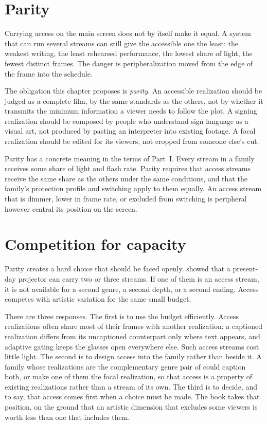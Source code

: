 \section{Parity}

Carrying access on the main screen does not by itself make it equal. A system that can run several streams can still give the accessible one the least: the weakest writing, the least rehearsed performance, the lowest share of light, the fewest distinct frames. The danger is peripheralization moved from the edge of the frame into the schedule.

The obligation this chapter proposes is \emph{parity}. An accessible realization should be judged as a complete film, by the same standards as the others, not by whether it transmits the minimum information a viewer needs to follow the plot. A signing realization should be composed by people who understand sign language as a visual art, not produced by pasting an interpreter into existing footage. A focal realization should be edited for its viewers, not cropped from someone else's cut.

Parity has a concrete meaning in the terms of Part~I. Every stream in a family receives some share of light and flash rate. Parity requires that access streams receive the same share as the others under the same conditions, and that the family's protection profile and switching apply to them equally. An access stream that is dimmer, lower in frame rate, or excluded from switching is peripheral however central its position on the screen.

\section{Competition for capacity}

Parity creates a hard choice that should be faced openly.  showed that a present-day projector can carry two or three streams. If one of them is an access stream, it is not available for a second genre, a second depth, or a second ending. Access competes with artistic variation for the same small budget.

There are three responses. The first is to use the budget efficiently. Access realizations often share most of their frames with another realization: a captioned realization differs from its uncaptioned counterpart only where text appears, and adaptive gating keeps the glasses open everywhere else. Such access streams cost little light. The second is to design access into the family rather than beside it. A family whose realizations are the complementary genre pair of  could caption both, or make one of them the focal realization, so that access is a property of existing realizations rather than a stream of its own. The third is to decide, and to say, that access comes first when a choice must be made. The book takes that position, on the ground that an artistic dimension that excludes some viewers is worth less than one that includes them.

